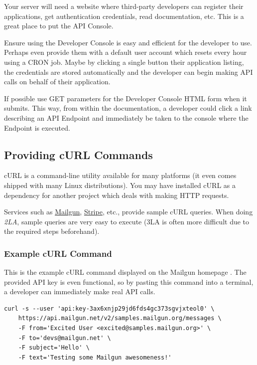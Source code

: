\documentclass{book}
\begin{document}
Your server will need a website where third-party developers can register their applications, get authentication credentials, read documentation, etc. This is a great place to put the API Console.

Ensure using the Developer Console is easy and efficient for the developer to use. Perhaps even provide them with a default user account which resets every hour using a CRON job. Maybe by clicking a single button their application listing, the credentials are stored automatically and the developer can begin making API calls on behalf of their application.

If possible use GET parameters for the Developer Console HTML form when it submits. This way, from within the documentation, a developer could click a link describing an API Endpoint and immediately be taken to the console where the Endpoint is executed.

\subsection{Providing cURL Commands}

cURL is a command-line utility available for many platforms (it even comes shipped with many Linux distributions). You may have installed cURL as a dependency for another project which deals with making HTTP requests.

Services such as \href{http://documentation.mailgun.com/api_reference.html}{Mailgun}, \href{https://stripe.com/docs/connect/oauth}{Stripe}, etc., provide sample cURL queries. When doing \emph{2LA}, sample queries are very easy to execute (3LA is often more difficult due to the required steps beforehand).

\subsubsection{Example cURL Command}

This is the example cURL command displayed on the Mailgun homepage \cite{MAILGUNHOME}. The provided API key is even functional, so by pasting this command into a terminal, a developer can immediately make real API calls.

\begin{verbatim}
curl -s --user 'api:key-3ax6xnjp29jd6fds4gc373sgvjxteol0' \
    https://api.mailgun.net/v2/samples.mailgun.org/messages \
    -F from='Excited User <excited@samples.mailgun.org>' \
    -F to='devs@mailgun.net' \
    -F subject='Hello' \
    -F text='Testing some Mailgun awesomeness!'
\end{verbatim}
\end{document}
